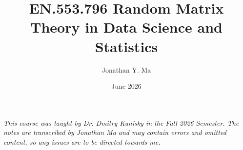 \documentclass[12pt,oneside]{book}
\title{EN.553.796 Random Matrix Theory in Data Science and Statistics}
\author{Jonathan Y. Ma}
\date{June 2026}
\numberwithin{equation}{section}
\theoremstyle{definition}
\theoremstyle{plain}
\theoremstyle{remark}
\begin{document}
\maketitle

\noindent \emph{This course was taught by Dr. Dmitry Kunisky in the Fall 2026 Semester. The notes are transcribed by Jonathan Ma and may contain errors and omitted content, so any issues are to be directed towards me.}

\tableofcontents
\end{document}
